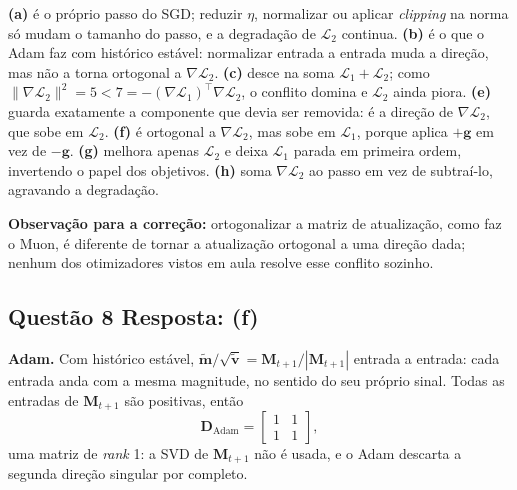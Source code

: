\documentclass[11pt,a4paper]{article}
\begin{document}
\textbf{(a)} é o próprio passo do SGD; reduzir $\eta$, normalizar ou aplicar \textit{clipping} na norma só mudam o tamanho do passo, e a degradação de $\mathcal{L}_2$ continua.
\textbf{(b)} é o que o Adam faz com histórico estável: normalizar entrada a entrada muda a direção, mas não a torna ortogonal a $\nabla\mathcal{L}_2$.
\textbf{(c)} desce na soma $\mathcal{L}_1 + \mathcal{L}_2$; como $\|\nabla\mathcal{L}_2\|^2 = 5 < 7 = -(\nabla\mathcal{L}_1)^{\top}\nabla\mathcal{L}_2$, o conflito domina e $\mathcal{L}_2$ ainda piora.
\textbf{(e)} guarda exatamente a componente que devia ser removida: é a direção de $\nabla\mathcal{L}_2$, que sobe em $\mathcal{L}_2$.
\textbf{(f)} é ortogonal a $\nabla\mathcal{L}_2$, mas sobe em $\mathcal{L}_1$, porque aplica $+\mathbf{g}$ em vez de $-\mathbf{g}$.
\textbf{(g)} melhora apenas $\mathcal{L}_2$ e deixa $\mathcal{L}_1$ parada em primeira ordem, invertendo o papel dos objetivos.
\textbf{(h)} soma $\nabla\mathcal{L}_2$ ao passo em vez de subtraí-lo, agravando a degradação.

\textbf{Observação para a correção:} ortogonalizar a matriz de atualização, como faz o Muon, é diferente de tornar a atualização ortogonal a uma direção dada; nenhum dos otimizadores vistos em aula resolve esse conflito sozinho.

\subsection*{Questão 8 \textemdash{} Resposta: (f)}
\textbf{Adam.} Com histórico estável, $\widetilde{\mathbf{m}}/\sqrt{\widetilde{\mathbf{v}}} = \mathbf{M}_{t+1}/|\mathbf{M}_{t+1}|$ entrada a entrada: cada entrada anda com a mesma magnitude, no sentido do seu próprio sinal. Todas as entradas de $\mathbf{M}_{t+1}$ são positivas, então
\[
\mathbf{D}_{\text{Adam}} = \begin{bmatrix} 1 & 1 \\ 1 & 1 \end{bmatrix},
\]
uma matriz de \textit{rank} 1: a SVD de $\mathbf{M}_{t+1}$ não é usada, e o Adam descarta a segunda direção singular por completo.
\end{document}
